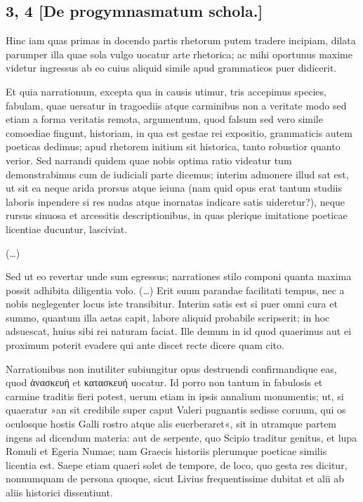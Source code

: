 \subsection*{3, 4 [De progymnasmatum schola.]}
 

Hinc iam quas primas in docendo partis rhetorum putem tradere incipiam, dilata parumper illa quae sola vulgo uocatur arte rhetorica; ac mihi oportunus maxime videtur ingressus ab eo cuius aliquid simile apud grammaticos puer didicerit.

Et quia narrationum, excepta qua in causis utimur, tris accepimus species, fabulam, quae uersatur in tragoediis atque carminibus non a veritate modo sed etiam a forma veritatis remota, argumentum, quod falsum sed vero simile comoediae fingunt, historiam, in qua est gestae rei expositio, grammaticis autem poeticas dedimus; apud rhetorem initium sit historica, tanto robustior quanto verior. Sed narrandi quidem quae nobis optima ratio videatur tum demonstrabimus cum de iudiciali parte dicemus; interim admonere illud sat est, ut sit ea neque arida prorsus atque ieiuna (nam quid opus erat tantum studiis laboris inpendere si res nudas atque inornatas indicare satis uideretur?), neque rursus sinuosa et arcessitis descriptionibus, in quas plerique imitatione poeticae licentiae ducuntur, lasciviat.

(\dots)

Sed ut eo revertar unde sum egressus; narrationes stilo componi quanta maxima possit adhibita diligentia volo. (\dots) Erit suum parandae facilitati tempus, nec a nobis neglegenter locus iste transibitur. Interim satis est si puer omni cura et summo, quantum illa aetas capit, labore aliquid probabile scripserit; in hoc adsuescat, huius sibi rei naturam faciat. Ille demum in id quod quaerimus aut ei proximum poterit evadere qui ante discet recte dicere quam cito.

Narrationibus non inutiliter subiungitur opus destruendi confirmandique eas, quod \textgreek[variant=ancient]{ἀνασκευή} et \textgreek[variant=ancient]{κατασκευή} uocatur. Id porro non tantum in fabulosis et carmine traditis fieri potest, uerum etiam in ipsis annalium monumentis; ut, si quaeratur »an sit credibile super caput Valeri pugnantis sedisse coruum, qui os oculosque hostis Galli rostro atque alis euerberaret«, sit in utramque partem ingens ad dicendum materia: aut de serpente, quo Scipio traditur genitus, et lupa Romuli et Egeria Numae; nam Graecis historiis plerumque poeticae similis licentia est. Saepe etiam quaeri solet de tempore, de loco, quo gesta res dicitur, nonnumquam de persona quoque, sicut Livius frequentissime dubitat et alii ab aliis historici dissentiunt.

